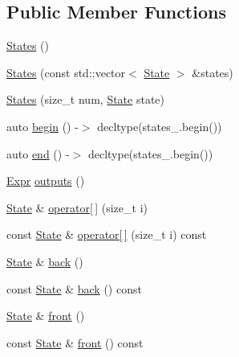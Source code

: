 \subsection*{Public Member Functions}
\begin{DoxyCompactItemize}
\item 
\hyperlink{classmarian_1_1rnn_1_1States_a6c7f0d8f86f47997f1af17fe705c71d5}{States} ()
\item 
\hyperlink{classmarian_1_1rnn_1_1States_a75ec1bb99b5e17f8bc253845b143aaa9}{States} (const std\+::vector$<$ \hyperlink{structmarian_1_1rnn_1_1State}{State} $>$ \&states)
\item 
\hyperlink{classmarian_1_1rnn_1_1States_a685063fb4d227663cf1cdb8937fa4ac6}{States} (size\+\_\+t num, \hyperlink{structmarian_1_1rnn_1_1State}{State} state)
\item 
auto \hyperlink{classmarian_1_1rnn_1_1States_a60e61291cb512a79f263d56431a1f33f}{begin} () -\/$>$ decltype(states\+\_\+.\+begin())
\item 
auto \hyperlink{classmarian_1_1rnn_1_1States_a1c6ba08bb8971e1afc621dd393f47684}{end} () -\/$>$ decltype(states\+\_\+.\+begin())
\item 
\hyperlink{namespacemarian_a498d8baf75b754011078b890b39c8e12}{Expr} \hyperlink{classmarian_1_1rnn_1_1States_a616c6828055565099320924bcb77b3da}{outputs} ()
\item 
\hyperlink{structmarian_1_1rnn_1_1State}{State} \& \hyperlink{classmarian_1_1rnn_1_1States_a9208d7250a1217c3003433d71843d21e}{operator\mbox{[}$\,$\mbox{]}} (size\+\_\+t i)
\item 
const \hyperlink{structmarian_1_1rnn_1_1State}{State} \& \hyperlink{classmarian_1_1rnn_1_1States_a53476e8b579873f89229a9ea08e9a783}{operator\mbox{[}$\,$\mbox{]}} (size\+\_\+t i) const 
\item 
\hyperlink{structmarian_1_1rnn_1_1State}{State} \& \hyperlink{classmarian_1_1rnn_1_1States_a678c607577574116ef2a7883bf698ec3}{back} ()
\item 
const \hyperlink{structmarian_1_1rnn_1_1State}{State} \& \hyperlink{classmarian_1_1rnn_1_1States_a59846fcf53c9e0cf3bb7520bc0b93731}{back} () const 
\item 
\hyperlink{structmarian_1_1rnn_1_1State}{State} \& \hyperlink{classmarian_1_1rnn_1_1States_aa4591eb77bab804e0f32b6a71fceda29}{front} ()
\item 
const \hyperlink{structmarian_1_1rnn_1_1State}{State} \& \hyperlink{classmarian_1_1rnn_1_1States_a8c824d694f2cccdd343b0e4e3d9e2096}{front} () const 
\item 

\end{DoxyCompactItemize}

